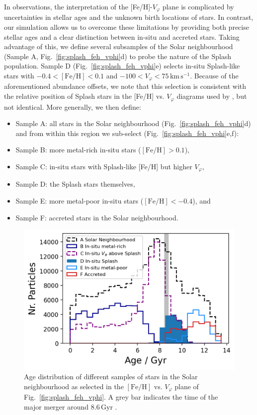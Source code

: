 \documentclass[fleqn,usenatbib]{mnras}
\begin{document}
In observations, the interpretation of the [Fe/H]-$V_\varphi$ plane is complicated by uncertainties in stellar ages and the unknown birth locations of stars. In contrast, our simulation allows us to overcome these limitations by providing both precise stellar ages and a clear distinction between in-situ and accreted stars. Taking advantage of this, we define several subsamples of the Solar neighbourhood (Sample A, Fig.~\ref{fig:splash_feh_vphi}d) to probe the nature of the Splash population. Sample D (Fig.~\ref{fig:splash_feh_vphi}e) selects in-situ Splash-like stars with $-0.4 < \mathrm{[Fe/H]} < 0.1$ and $-100 < V_\varphi < 75\,\mathrm{km\,s^{-1}}$. Because of the aforementioned abundance offsets, we note that this selection is consistent with the relative position of Splash stars in the [Fe/H] vs. $V_\varphi$ diagrams used by \citet{Belokurov2020}, but not identical. More generally, we then define:
\begin{itemize}[leftmargin=2em,labelwidth=2em]
    \item Sample A: all stars in the Solar neighbourhood (Fig.~\ref{fig:splash_feh_vphi}d) \\
    and from within this region we sub-select (Fig.~\ref{fig:splash_feh_vphi}e,f):
    \item Sample B: more metal-rich in-situ stars ($\mathrm{[Fe/H]} > 0.1$),
    \item Sample C: in-situ stars with Splash-like [Fe/H] but higher $V_\varphi$,
    \item Sample D: the Splash stars themselves,
    \item Sample E: more metal-poor in-situ stars ($\mathrm{[Fe/H]} < -0.4$), and
    \item Sample F: accreted stars in the Solar neighbourhood.
\end{itemize}

\begin{figure}
    \centering
    \includegraphics[width=0.9\columnwidth]{figures/splash_age.png}
    \caption{Age distribution of different samples of stars in the Solar neighbourhood as selected in the $\mathrm{[Fe/H]}$ vs. $V_\varphi$ plane of Fig.~\ref{fig:splash_feh_vphi}. A grey bar indicates the time of the major merger around $8.6\,\mathrm{Gyr}$ \href{https://github.com/svenbuder/gse_nihaouhd/tree/main/figures}{\faGithub}.}
    \label{fig:splash_age}
\end{figure}
\end{document}
